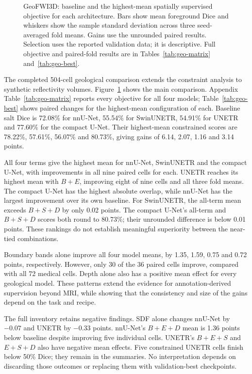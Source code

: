 \documentclass[12pt,a4paper]{article}
\begin{document}
\begin{figure}[htbp]
\caption{GeoFWI3D: baseline and the highest-mean spatially supervised objective for each architecture. Bars show mean foreground Dice and whiskers show the sample standard deviation across three seed-averaged fold means. Gains use the unrounded paired results. Selection uses the reported validation data; it is descriptive. Full objective and paired-fold results are in Tables~\ref{tab:geo-matrix} and~\ref{tab:geo-best}.}
\label{fig:geo-key-results}
\end{figure}


The completed 504-cell geological comparison extends the constraint
analysis to synthetic reflectivity volumes. Figure~\ref{fig:geo-key-results}
shows the main comparison. Appendix Table~\ref{tab:geo-matrix}
reports every objective for all four models; Table~\ref{tab:geo-best}
shows paired changes for the highest-mean configuration of each.
Baseline salt Dice is 72.08\% for nnU-Net, 55.54\% for SwinUNETR,
54.91\% for UNETR and 77.60\% for the compact U-Net. Their
highest-mean constrained scores are 78.22\%, 57.61\%, 56.07\% and
80.73\%, giving gains of 6.14, 2.07, 1.16 and 3.14 points.


All four terms give the highest mean for nnU-Net, SwinUNETR and the
compact U-Net, with improvements in all nine paired cells for each.
UNETR reaches its highest mean with $B+E$, improving eight of nine
cells and all three fold means. The compact U-Net has the highest
absolute overlap, while nnU-Net has the largest improvement over its
own baseline. For SwinUNETR, the all-term mean exceeds $B+S+D$ by
only 0.02 points. The compact U-Net's all-term and $B+S+D$ scores
both round to 80.73\%; their unrounded difference is below 0.01
points. These rankings do not establish meaningful superiority
between the near-tied combinations.

Boundary bands alone improve all four model means, by 1.35, 1.59,
0.75 and 0.72 points, respectively. However, only 30 of the 36 paired
cells improve, compared with all 72 medical cells. Depth alone also
has a positive mean effect for every geological model. These patterns
extend the evidence for annotation-derived supervision beyond MRI,
while showing that the consistency and size of the gains depend on
the task and recipe.

The full inventory retains negative findings. SDF alone changes
nnU-Net by $-0.07$ and UNETR by $-0.33$ points. nnU-Net's
$B+E+D$ mean is 1.36 points below baseline despite improving five
individual cells. UNETR's $B+E+S$ and $E+S+D$ also have negative
mean effects. Five constrained UNETR cells finish below 50\% Dice;
they remain in the summaries. No interpretation depends on discarding
those outcomes or replacing them with validation-best checkpoints.
\end{document}
